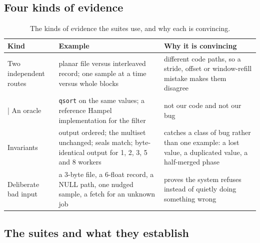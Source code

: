 \documentclass[12pt,a4paper,oneside]{report}
\begin{document}
\subsection{Four kinds of evidence}

\begin{table}[H]
\centering
\caption{The kinds of evidence the suites use, and why each is convincing.}
\label{tab:test-evidence}
\begin{tabular}{@{}lp{4.9cm}p{5.6cm}@{}}
\hline
Kind & Example & Why it is convincing \\
\hline
Two independent routes & planar file versus interleaved record; one sample at a time versus whole blocks & different code paths, so a stride, offset or window-refill mistake makes them disagree \\
| An oracle & \texttt{qsort} on the same values; a reference Hampel implementation for the filter & not our code and not our bug \\
Invariants & output ordered; the multiset unchanged; seals match; byte-identical output for 1, 2, 3, 5 and 8 workers & catches a class of bug rather than one example: a lost value, a duplicated value, a half-merged phase \\
Deliberate bad input & a 3-byte file, a 6-float record, a NULL path, one nudged sample, a fetch for an unknown job & proves the system refuses instead of quietly doing something wrong \\
\hline
\end{tabular}
\end{table}

\subsection{The suites and what they establish}
\end{document}
